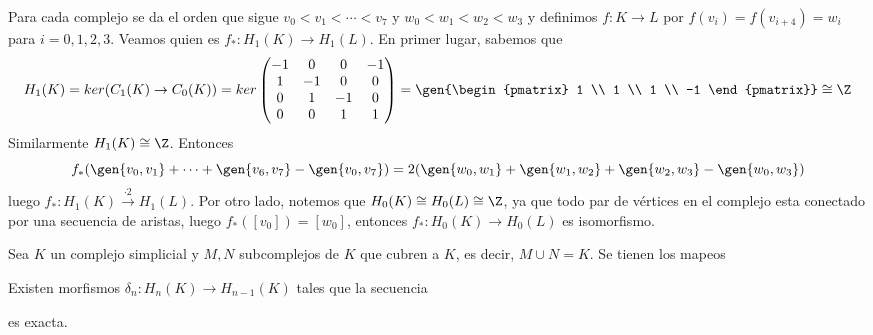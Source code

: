 \documentclass{article}
\begin{document}
Para cada complejo se da el orden que sigue $v_{0}<v_{1}<\cdots<v_{7}$ y $w_{0}<w_{1}<w_{2}<w_{3}$ 
y definimos $f:K\to L$ por $f(v_{i})=f(v_{i+4})=w_{i}$ para $i=0,1,2,3$. Veamos quien es 
$f_{*}:H_{1}(K)\to H_{1}(L)$. En primer lugar, sabemos que
\begin{equation*}
    H_{1}(K)=ker(C_{1}(K)\to C_{0}(K))=ker\begin{pmatrix}
        -1 & 0 & 0 & -1 \\ 1 & -1 & 0 & 0 \\ 0 & 1 & -1 & 0 \\ 0 & 0 & 1 & 1
    \end{pmatrix}=\gen{\begin{pmatrix}
        1 \\ 1 \\ 1 \\ -1
    \end{pmatrix}}\cong\Z
\end{equation*}
Similarmente $H_{1}(K)\cong\Z$. Entonces
\begin{equation*}
    f_{*}(\gen{v_{0},v_{1}}+\cdots+\gen{v_{6},v_{7}}-\gen{v_{0},v_{7}})
    =2(\gen{w_{0},w_{1}}+\gen{w_{1},w_{2}}+\gen{w_{2},w_{3}}-\gen{w_{0},w_{3}})
\end{equation*}
luego $f_{*}:H_{1}(K)\xrightarrow{\cdot2} H_{1}(L)$. Por otro lado, notemos que 
$H_{0}(K)\cong H_{0}(L)\cong\Z$, ya que todo par de vértices en el complejo esta conectado por una
secuencia de aristas, luego $f_{*}([v_{0}])=[w_{0}]$, entonces 
$f_{*}:H_{0}(K)\xrightarrow{} H_{0}(L)$ es isomorfismo.

\vspace{2mm}
\begin{teo}
    Sea $K$ un complejo simplicial y $M,N$ subcomplejos de $K$ que cubren a $K$, es decir, 
    $M\cup N=K$. Se tienen los mapeos
    
    \centerline{
    }

    \vspace{2mm}
    Existen morfismos $\delta_{n}:H_{n}(K)\to H_{n-1}(K)$ tales que la secuencia

    \centerline{
        \xymatrixcolsep{3pc}
    }
    es exacta.
\end{teo}
\end{document}
